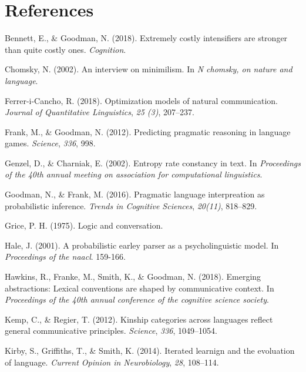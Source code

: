 \documentclass[10pt, letterpaper]{article}
\begin{document}
\section{References}\label{references}

\setlength{\parindent}{-0.1in} \setlength{\leftskip}{0.125in} \noindent

\hypertarget{refs}{}
\hypertarget{ref-BennettGoodman2015a}{}
Bennett, E., \& Goodman, N. (2018). Extremely costly intensifiers are
stronger than quite costly ones. \emph{Cognition}.

\hypertarget{ref-Chomsky2002a}{}
Chomsky, N. (2002). An interview on minimilism. In \emph{N chomsky, on
nature and language}.

\hypertarget{ref-FerreriCancho2018a}{}
Ferrer-i-Cancho, R. (2018). Optimization models of natural
communication. \emph{Journal of Quantitative Linguistics}, \emph{25
(3)}, 207--237.

\hypertarget{ref-FrankGoodman2012a}{}
Frank, M., \& Goodman, N. (2012). Predicting pragmatic reasoning in
language games. \emph{Science}, \emph{336}, 998.

\hypertarget{ref-GenzelCharniak2002a}{}
Genzel, D., \& Charniak, E. (2002). Entropy rate constancy in text. In
\emph{Proceedings of the 40th annual meeting on association for
computational linguistics}.

\hypertarget{ref-GoodmanFrank2016a}{}
Goodman, N., \& Frank, M. (2016). Pragmatic language interpreation as
probabilistic inference. \emph{Trends in Cognitive Sciences},
\emph{20(11)}, 818--829.

\hypertarget{ref-Grice1975a}{}
Grice, P. H. (1975). Logic and conversation.

\hypertarget{ref-Hale2001a}{}
Hale, J. (2001). A probabilistic earley parser as a psycholinguistic
model. In \emph{Proceedings of the naacl}. 159-166.

\hypertarget{ref-HawkinsFrankeSmithGoodman2018a}{}
Hawkins, R., Franke, M., Smith, K., \& Goodman, N. (2018). Emerging
abstractions: Lexical conventions are shaped by communicative context.
In \emph{Proceedings of the 40th annual conference of the cognitive
science society}.

\hypertarget{ref-KempRegier2012a}{}
Kemp, C., \& Regier, T. (2012). Kinship categories across languages
reflect general communicative principles. \emph{Science}, \emph{336},
1049--1054.

\hypertarget{ref-KirbyGriffithsSmith2014a}{}
Kirby, S., Griffiths, T., \& Smith, K. (2014). Iterated learnign and the
evoluation of language. \emph{Current Opinion in Neurobiology},
\emph{28}, 108--114.
\end{document}
